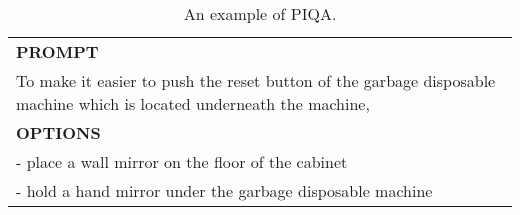 \begin{table}[ht]
    \centering \small
\begin{tabular}{p{12cm}}
\toprule
\textbf{PROMPT}\\
To make it easier to push the reset button of the garbage disposable machine which is located underneath the machine,\\
\midrule
\textbf{OPTIONS}\\
- place a wall mirror on the floor of the cabinet\\
- hold a hand mirror under the garbage disposable machine\\
\bottomrule
\end{tabular}
    \caption{\centering An example of PIQA.}
    \label{tab:PIQA_eval_format_example}
\end{table}

